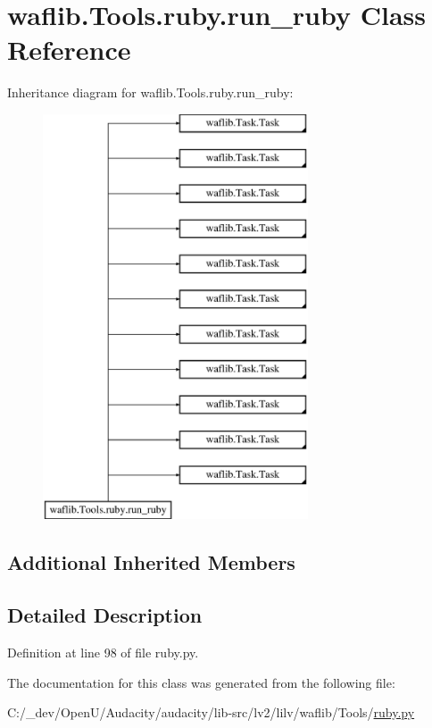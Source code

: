 \hypertarget{classwaflib_1_1_tools_1_1ruby_1_1run__ruby}{}\section{waflib.\+Tools.\+ruby.\+run\+\_\+ruby Class Reference}
\label{classwaflib_1_1_tools_1_1ruby_1_1run__ruby}
Inheritance diagram for waflib.\+Tools.\+ruby.\+run\+\_\+ruby\+:\begin{figure}[H]
\begin{center}
\leavevmode
\includegraphics[height=12.000000cm]{classwaflib_1_1_tools_1_1ruby_1_1run__ruby}
\end{center}
\end{figure}
\subsection*{Additional Inherited Members}


\subsection{Detailed Description}


Definition at line 98 of file ruby.\+py.



The documentation for this class was generated from the following file\+:\begin{DoxyCompactItemize}
\item 
C\+:/\+\_\+dev/\+Open\+U/\+Audacity/audacity/lib-\/src/lv2/lilv/waflib/\+Tools/\hyperlink{lilv_2waflib_2_tools_2ruby_8py}{ruby.\+py}\end{DoxyCompactItemize}
